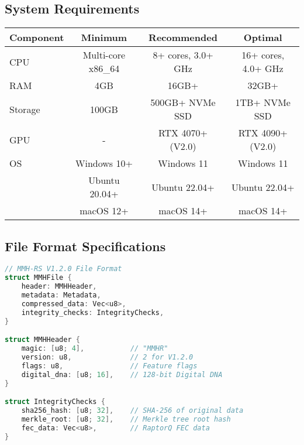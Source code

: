 \documentclass[12pt,a4paper]{article}
\begin{document}
\subsection{System Requirements}
\begin{center}
\begin{tabular}{|l|c|c|c|}
\hline
\textbf{Component} & \textbf{Minimum} & \textbf{Recommended} & \textbf{Optimal} \\
\hline
CPU & Multi-core x86\_64 & 8+ cores, 3.0+ GHz & 16+ cores, 4.0+ GHz \\
RAM & 4GB & 16GB+ & 32GB+ \\
Storage & 100GB & 500GB+ NVMe SSD & 1TB+ NVMe SSD \\
GPU & - & RTX 4070+ (V2.0) & RTX 4090+ (V2.0) \\
OS & Windows 10+ & Windows 11 & Windows 11 \\
& Ubuntu 20.04+ & Ubuntu 22.04+ & Ubuntu 22.04+ \\
& macOS 12+ & macOS 14+ & macOS 14+ \\
\hline
\end{tabular}
\end{center}

\subsection{File Format Specifications}
\begin{lstlisting}[language=C, caption=Complete File Format]
// MMH-RS V1.2.0 File Format
struct MMHFile {
    header: MMHHeader,
    metadata: Metadata,
    compressed_data: Vec<u8>,
    integrity_checks: IntegrityChecks,
}

struct MMHHeader {
    magic: [u8; 4],           // "MMHR"
    version: u8,              // 2 for V1.2.0
    flags: u8,                // Feature flags
    digital_dna: [u8; 16],    // 128-bit Digital DNA
}

struct IntegrityChecks {
    sha256_hash: [u8; 32],    // SHA-256 of original data
    merkle_root: [u8; 32],    // Merkle tree root hash
    fec_data: Vec<u8>,        // RaptorQ FEC data
}
\end{lstlisting}
\end{document}
